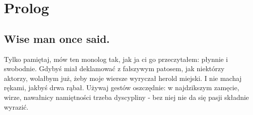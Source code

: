 \chapter{Prolog}
\section{Wise man once said.}
Tylko pamiętaj, mów ten monolog tak, jak ja ci go przeczytałem: płynnie i swobodnie. Gdybyś miał deklamować z fałszywym patosem, jak niektórzy aktorzy, wolałbym już, żeby moje wiersze wyryczał herold miejski. I nie machaj rękami, jakbyś drwa rąbał. Używaj gestów oszczędnie: w najdzikszym zamęcie, wirze, nawałnicy namiętności trzeba dyscypliny - bez niej nie da się pasji składnie wyrazić.


